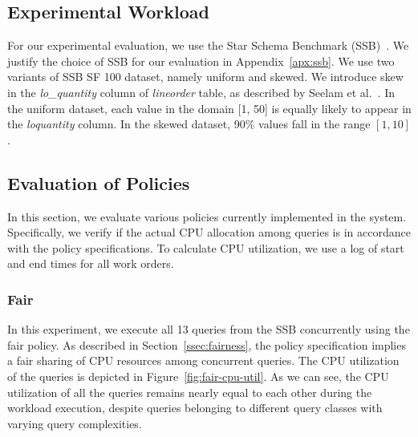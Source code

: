 
\subsection{Experimental Workload}\label{ssec:workload}
For our experimental evaluation, we use the Star Schema Benchmark (SSB)~\cite{ssb}. 
We justify the choice of SSB for our evaluation in Appendix~\ref{apx:ssb}.
We use two variants of SSB SF 100 dataset, namely uniform and skewed. 
We introduce skew in the \textit{lo\_quantity} column of \textit{lineorder} table, as described by Seelam et al.~\cite{DBLP:conf/wosp/2013}.
In the uniform dataset, each value in the domain [1, 50] is equally likely to appear in the \textit{lo\textunderscore quantity} column.
In the skewed dataset, 90\% values fall in the range $[1, 10]$. 

\subsection{Evaluation of Policies}\label{ssec:policy-eval}
In this section, we evaluate various policies currently implemented in the system.
Specifically, we verify if the actual CPU allocation among queries is in accordance with the policy specifications.
To calculate CPU utilization, we use a log of start and end times for all work orders. %

\subsubsection{Fair}
In this experiment, we execute all 13 queries from the SSB concurrently using the fair policy. 
As described in Section~\ref{ssec:fairness}, the policy specification implies a fair sharing of CPU resources among concurrent queries.
The CPU utilization of the queries is depicted in Figure~\ref{fig:fair-cpu-util}.
As we can see, the CPU utilization of all the queries remains nearly equal to each other during the workload execution, despite queries belonging to different query classes with varying query complexities.

